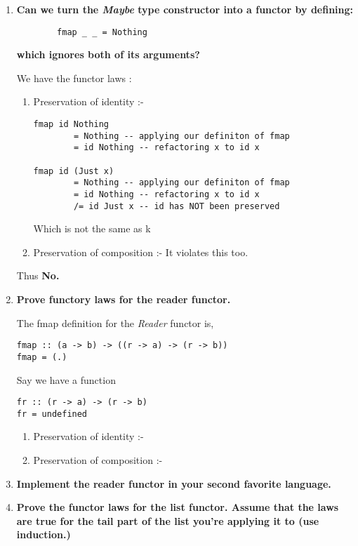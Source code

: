 \documentclass{article}
\begin{document}
\begin{enumerate}
	\item \textbf{Can we turn the \textit{Maybe} type constructor into a functor by defining: }
	      \begin{verbatim}
		fmap _ _ = Nothing	
		\end{verbatim}
	      \textbf{which ignores both of its arguments?}

	      We have the functor laws :
	      \begin{enumerate}
		      \item Preservation of identity :-
		            \begin{verbatim}
fmap id Nothing 
  	    = Nothing -- applying our definiton of fmap
  	    = id Nothing -- refactoring x to id x

fmap id (Just x) 
  	    = Nothing -- applying our definiton of fmap
  	    = id Nothing -- refactoring x to id x
	    /= id Just x -- id has NOT been preserved
			      \end{verbatim}
		            Which is not the same as k


		      \item Preservation of composition :- It violates this too.

	      \end{enumerate}
	      Thus \textbf{No.}

	\item \textbf{Prove functory laws for the reader functor.}

	      The fmap definition for the \textit{Reader} functor is,
	      \begin{verbatim}
fmap :: (a -> b) -> ((r -> a) -> (r -> b))
fmap = (.)
		\end{verbatim}
	      Say we have a function
	      \begin{verbatim}
fr :: (r -> a) -> (r -> b)
fr = undefined
		\end{verbatim}

	      \begin{enumerate}
		      \item Preservation of identity :-
		      \item Preservation of composition :-

	      \end{enumerate}

	\item \textbf{Implement the reader functor in your second favorite language.}
	\item \textbf{Prove the functor laws for the list functor. Assume that the laws are true for the tail part of the list you're applying it to (use induction.)}
\end{enumerate}
\end{document}
